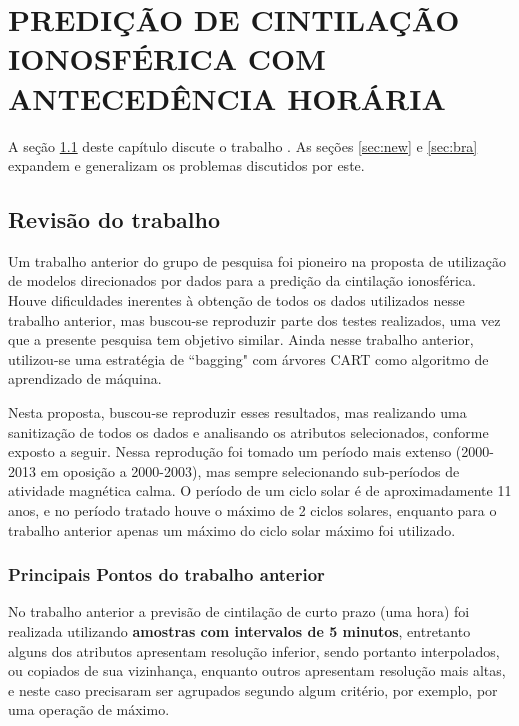 \chapter{PREDIÇÃO DE CINTILAÇÃO IONOSFÉRICA COM ANTECEDÊNCIA HORÁRIA}\label{ch:revisonrezende}

A seção \ref{sec:revision} deste capítulo discute o trabalho \cite{REZENDE:2009}. As seções \ref{sec:new} e \ref{sec:bra} expandem e generalizam os problemas discutidos por este.

\section{Revisão do trabalho \cite{REZENDE:2009}}\label{sec:revision}

Um trabalho anterior do grupo de pesquisa \cite{REZENDE:2009} foi pioneiro na proposta de utilização de modelos direcionados por dados para a predição da cintilação ionosférica. Houve dificuldades inerentes à obtenção de todos os dados utilizados nesse trabalho anterior, mas buscou-se reproduzir parte dos testes realizados, uma vez que a presente pesquisa tem objetivo similar. Ainda nesse trabalho anterior, utilizou-se uma estratégia de ``bagging" com árvores CART como algoritmo de aprendizado de máquina.

Nesta proposta, buscou-se reproduzir esses resultados, mas realizando uma sanitização de todos os dados e analisando os atributos selecionados, conforme exposto a seguir. Nessa reprodução foi tomado um período mais extenso (2000-2013 em oposição a 2000-2003), mas sempre selecionando sub-períodos de atividade magnética calma. O período de um ciclo solar é de aproximadamente 11 anos, e no período tratado houve o máximo de 2 ciclos solares, enquanto para o trabalho anterior apenas um máximo do ciclo solar máximo foi utilizado.

\subsection{Principais Pontos do trabalho anterior}

No trabalho anterior \cite{REZENDE:2009} a previsão de cintilação de curto prazo (uma hora) foi realizada utilizando {\bf amostras com intervalos de 5 minutos}, entretanto alguns dos atributos apresentam resolução inferior, sendo portanto interpolados, ou copiados de sua vizinhança, enquanto outros apresentam resolução mais altas, e neste caso precisaram ser agrupados segundo algum critério, por exemplo, por uma operação de máximo.

